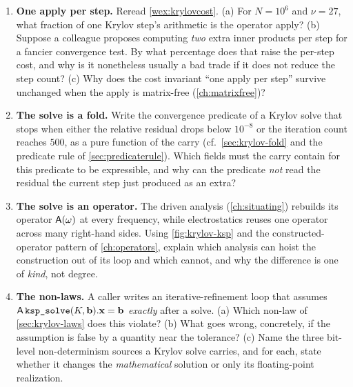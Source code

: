 \begin{enumerate}[nosep]
  Relate your answer to \cref{fig:krylov-convergence}.
  \item \textbf{One apply per step.} Reread \cref{wex:krylovcost}. (a) For
  $N=10^6$ and $\nu=27$, what fraction of one Krylov step's arithmetic is the operator
  apply? (b) Suppose a colleague proposes computing \emph{two} extra inner products per
  step for a fancier convergence test. By what percentage does that raise the per-step
  cost, and why is it nonetheless usually a bad trade if it does not reduce the step
  count? (c) Why does the cost invariant ``one apply per step'' survive unchanged when
  the apply is matrix-free (\cref{ch:matrixfree})?
  \item \textbf{The solve is a fold.} Write the convergence predicate of a Krylov
  solve that stops when either the relative residual drops below $10^{-8}$ or the
  iteration count reaches $500$, as a pure function of the carry (cf.\
  \cref{sec:krylov-fold} and the predicate rule of \cref{sec:predicaterule}). Which
  fields must the carry contain for this predicate to be expressible, and why can the
  predicate \emph{not} read the residual the current step just produced as an extra?
  \item \textbf{The solve is an operator.} The driven analysis (\cref{ch:situating})
  rebuilds its operator $\mathsf{A}(\omega)$ at every frequency, while electrostatics
  reuses one operator across many right-hand sides. Using
  \cref{fig:krylov-ksp} and the constructed-operator pattern of \cref{ch:operators},
  explain which analysis can hoist the \code{ksp\_solve} construction out of its loop
  and which cannot, and why the difference is one of \emph{kind}, not degree.
  \item \textbf{The non-laws.} A caller writes an iterative-refinement loop that
  assumes $\mathsf{A}\,\texttt{ksp\_solve}(K,\mathbf{b}).\mathbf{x}=\mathbf{b}$ \emph{exactly} after a solve.
  (a) Which non-law of \cref{sec:krylov-laws} does this violate? (b) What goes wrong,
  concretely, if the assumption is false by a quantity near the tolerance? (c) Name
  the three bit-level non-determinism sources a Krylov solve carries, and for each,
  state whether it changes the \emph{mathematical} solution or only its
  floating-point realization.
\end{enumerate}
